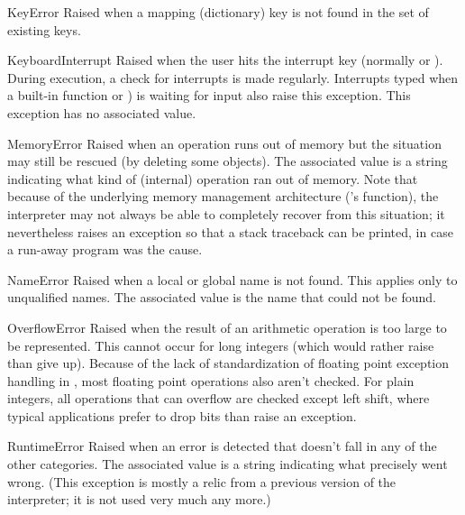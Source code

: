 \begin{excdesc}{KeyError}
  Raised when a mapping (dictionary) key is not found in the set of
  existing keys.
\end{excdesc}

\begin{excdesc}{KeyboardInterrupt}
  Raised when the user hits the interrupt key (normally
   or ).  During execution, a check for
  interrupts is made regularly.
  Interrupts typed when a built-in function  or
  ) is waiting for input also raise this
  exception.  This exception has no associated value.
\end{excdesc}

\begin{excdesc}{MemoryError}
  Raised when an operation runs out of memory but the situation may
  still be rescued (by deleting some objects).  The associated value is
  a string indicating what kind of (internal) operation ran out of memory.
  Note that because of the underlying memory management architecture
  (\C{}'s  function), the interpreter may not always be able
  to completely recover from this situation; it nevertheless raises an
  exception so that a stack traceback can be printed, in case a run-away
  program was the cause.
\end{excdesc}

\begin{excdesc}{NameError}
  Raised when a local or global name is not found.  This applies only
  to unqualified names.  The associated value is the name that could
  not be found.
\end{excdesc}

\begin{excdesc}{OverflowError}
  Raised when the result of an arithmetic operation is too large to be
  represented.  This cannot occur for long integers (which would rather
  raise  than give up).  Because of the lack of
  standardization of floating point exception handling in \C{}, most
  floating point operations also aren't checked.  For plain integers,
  all operations that can overflow are checked except left shift, where
  typical applications prefer to drop bits than raise an exception.
\end{excdesc}

\begin{excdesc}{RuntimeError}
  Raised when an error is detected that doesn't fall in any of the
  other categories.  The associated value is a string indicating what
  precisely went wrong.  (This exception is mostly a relic from a
  previous version of the interpreter; it is not used very much any
  more.)
\end{excdesc}

